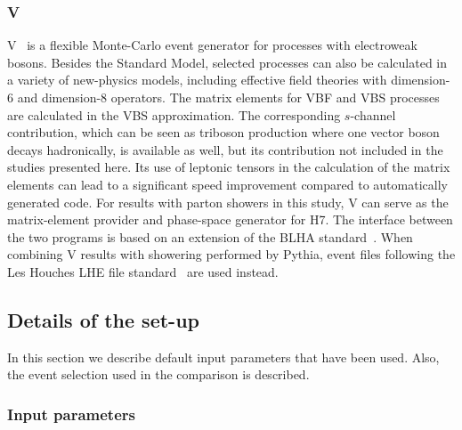 \documentclass[11pt]{cernrep}
\newcommand{\Herwig}{H\protect\scalebox{0.8}{ERWIG}7\xspace}
\newcommand{\VBFNLO}{V\protect\scalebox{0.8}{BFNLO}\xspace}
\begin{document}
\subsubsection*{\protect\VBFNLO \label{vbs_VBFNLO}}
\VBFNLO~\cite{Arnold:2008rz,Arnold:2011wj,Baglio:2014uba} is a flexible
Monte-Carlo event generator for processes with electroweak bosons.
Besides the Standard Model, selected processes can also be calculated in
a variety of new-physics models, including effective field theories with
dimension-6 and dimension-8 operators.
The matrix elements for VBF and VBS processes are calculated in the VBS
approximation. The corresponding $s$-channel contribution, which can be
seen as triboson production where one vector boson decays hadronically,
is available as well, but its contribution not included in the studies
presented here.
Its use of leptonic tensors in the calculation of the matrix elements
can lead to a significant speed improvement compared to automatically
generated code.
For results with parton showers in this study, \VBFNLO can serve as the
matrix-element provider and phase-space generator for \Herwig. The
interface between the two programs is based on an extension of the BLHA
standard~\cite{Binoth:2010xt,Alioli:2013nda,Andersen:2014efa}. When
combining \VBFNLO results with showering performed by Pythia, event
files following the Les Houches LHE file
standard~\cite{Boos:2001cv,Alwall:2006yp} are used instead.


\subsection{Details of the set-up \label{setup}}

In this section we describe default input parameters that have been used.
Also, the event selection used in the comparison is described.

\subsubsection*{Input parameters}
\end{document}
